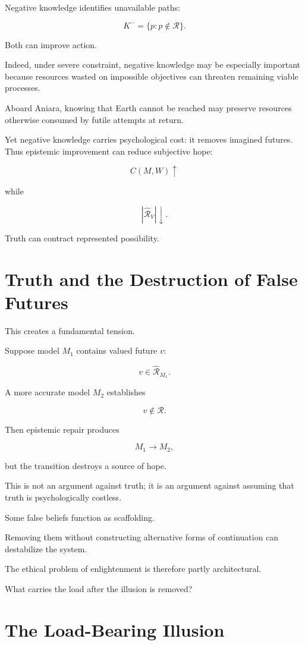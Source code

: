 \documentclass[11pt,oneside]{book}
\theoremstyle{definition}
\theoremstyle{remark}
\newcommand{\R}{\mathcal{R}}
\begin{document}
Negative knowledge identifies unavailable paths:

\[
K^-
=
\{p:p\notin\R\}.
\]

Both can improve action.

Indeed, under severe constraint, negative knowledge may be especially important because resources wasted on impossible objectives can threaten remaining viable processes.

Aboard Aniara, knowing that Earth cannot be reached may preserve resources otherwise consumed by futile attempts at return.

Yet negative knowledge carries psychological cost: it removes imagined futures. Thus epistemic improvement can reduce subjective hope:

\[
C(M,W)\uparrow
\]

while

\[
|\widehat{\R}_V|\downarrow.
\]

Truth can contract represented possibility.

\section{Truth and the Destruction of False Futures}

This creates a fundamental tension.

Suppose model \(M_1\) contains valued future \(v\):

\[
v\in\widehat{\R}_{M_1}.
\]

A more accurate model \(M_2\) establishes

\[
v\notin\R.
\]

Then epistemic repair produces

\[
M_1\rightarrow M_2,
\]

but the transition destroys a source of hope.

This is not an argument against truth; it is an argument against assuming that truth is psychologically costless.

Some false beliefs function as scaffolding.

Removing them without constructing alternative forms of continuation can destabilize the system.

The ethical problem of enlightenment is therefore partly architectural.

What carries the load after the illusion is removed?

\section{The Load-Bearing Illusion}
\end{document}
